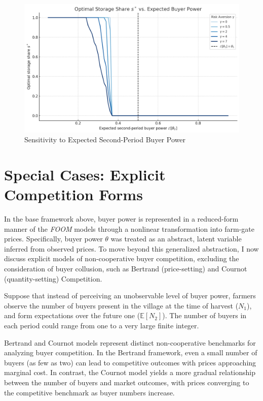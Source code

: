 \begin{figure}[pht]
\centering
\includegraphics[width=\textwidth]{model_figures/sensitivity_to_theta_2.png}
\caption{Sensitivity to Expected Second-Period Buyer Power}
\label{Figure: sensitivity to second-period buyer power}
\end{figure}



\section{Special Cases: Explicit Competition Forms}
\noindent In the base framework above, buyer power is represented in a reduced-form manner of the \textit{FOOM} models through a nonlinear transformation into farm-gate prices. Specifically, buyer power $\theta$ was treated as an abstract, latent variable inferred from observed prices. To move beyond this generalized abstraction, I now discuss explicit models of non-cooperative buyer competition, excluding the consideration of buyer collusion, such as Bertrand (price-setting) and Cournot (quantity-setting) Competition. 

Suppose that instead of perceiving an unobservable level of buyer power, farmers observe the number of buyers present in the village at the time of harvest ($N_1$), and form expectations over the future one ($\mathbb{E}[N_2]$). The number of buyers in each period could range from one to a very large finite integer.

Bertrand and Cournot models represent distinct non-cooperative benchmarks for analyzing buyer competition. In the Bertrand framework, even a small number of buyers (as few as two) can lead to competitive outcomes with prices approaching marginal cost. In contrast, the Cournot model yields a more gradual relationship between the number of buyers and market outcomes, with prices converging to the competitive benchmark as buyer numbers increase.


